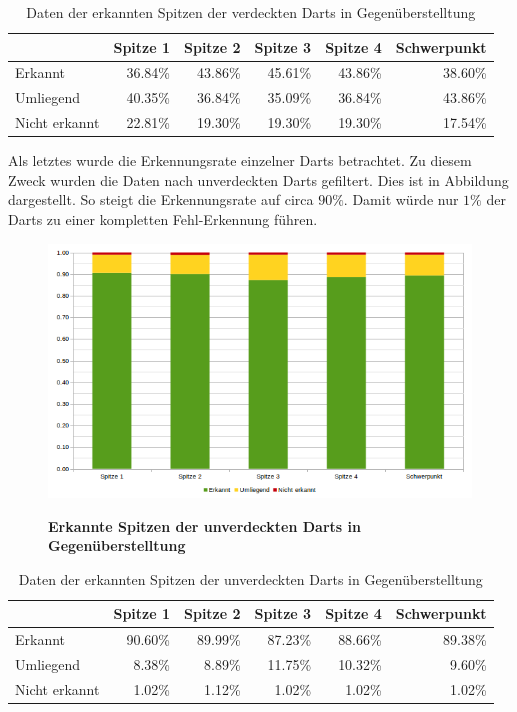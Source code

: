 \begin{table}[htbp]
\caption{Daten der erkannten Spitzen der verdeckten Darts in Gegenüberstelltung}
\begin{tabular}{|l|r|r|r|r|r|}
\hline
 & \multicolumn{1}{l|}{Spitze 1} & \multicolumn{1}{l|}{Spitze 2} & \multicolumn{1}{l|}{Spitze 3} & \multicolumn{1}{l|}{Spitze 4} & \multicolumn{1}{l|}{Schwerpunkt} \\ \hline
Erkannt & 36.84\% & 43.86\% & 45.61\% & 43.86\% & 38.60\% \\ \hline
Umliegend & 40.35\% & 36.84\% & 35.09\% & 36.84\% & 43.86\% \\ \hline
Nicht erkannt & 22.81\% & 19.30\% & 19.30\% & 19.30\% & 17.54\% \\ \hline
\end{tabular}
\label{}
\end{table}


Als letztes wurde die Erkennungsrate einzelner Darts betrachtet. Zu diesem Zweck wurden die Daten nach unverdeckten Darts gefiltert. 
Dies ist in Abbildung  dargestellt. So steigt die Erkennungsrate auf circa $90\%$. Damit würde nur $1\%$ der Darts zu einer kompletten Fehl-Erkennung führen. 

\begin{figure}[ht]
\centering
\includegraphics[width=\textwidth]{media/chartwithoutcovert}\\
\caption{\textbf{Erkannte Spitzen der unverdeckten Darts in Gegenüberstelltung}}
\label{Fig:chartuncovert}
\end{figure}

\begin{table}[ht]
\caption{Daten der erkannten Spitzen der unverdeckten Darts in Gegenüberstelltung}
\begin{tabular}{|l|r|r|r|r|r|}
\hline
 & \multicolumn{1}{l|}{Spitze 1} & \multicolumn{1}{l|}{Spitze 2} & \multicolumn{1}{l|}{Spitze 3} & \multicolumn{1}{l|}{Spitze 4} & \multicolumn{1}{l|}{Schwerpunkt} \\ \hline
Erkannt & 90.60\% & 89.99\% & 87.23\% & 88.66\% & 89.38\% \\ \hline
Umliegend & 8.38\% & 8.89\% & 11.75\% & 10.32\% & 9.60\% \\ \hline
Nicht erkannt & 1.02\% & 1.12\% & 1.02\% & 1.02\% & 1.02\% \\ \hline
\end{tabular}
\label{}
\end{table}


